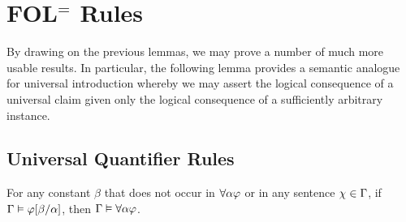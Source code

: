 \section{FOL$^=$ Rules}%
  \label{sec:FOL-Rules}

By drawing on the previous lemmas, we may prove a number of much more usable results.
In particular, the following lemma provides a semantic analogue for universal introduction whereby we may assert the logical consequence of a universal claim given only the logical consequence of a sufficiently arbitrary instance.

\subsection{Universal Quantifier Rules}%
  \label{sub:UniversalRules}
  

\begin{Lthm} \label{lemma:unigen}
  For any constant $\beta$ that does not occur in $\forall \alpha\varphi$ or in any sentence $\chi\in\Gamma$, if $\Gamma \vDash \varphi[\beta/\alpha]$, then $\Gamma \vDash \forall \alpha\varphi$. 
\end{Lthm}

